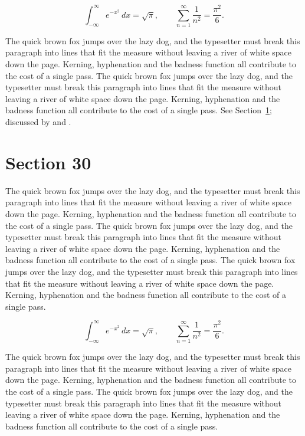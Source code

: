 \documentclass{article}
\begin{document}
\begin{equation}\label{eq:29}
\int_{-\infty}^{\infty} e^{-x^{2}}\,dx = \sqrt{\pi}, \qquad
\sum_{n=1}^{\infty} \frac{1}{n^{2}} = \frac{\pi^{2}}{6}.
\end{equation}

The quick brown fox jumps over the lazy dog, and the typesetter must break this paragraph into lines that fit the measure without leaving a river of white space down the page. Kerning, hyphenation and the badness function all contribute to the cost of a single pass. The quick brown fox jumps over the lazy dog, and the typesetter must break this paragraph into lines that fit the measure without leaving a river of white space down the page. Kerning, hyphenation and the badness function all contribute to the cost of a single pass. 
See Section~\ref{sec:30}; discussed by \textcite{k5} and \textcite{l2}.
\section{Section 30}
\label{sec:30}
The quick brown fox jumps over the lazy dog, and the typesetter must break this paragraph into lines that fit the measure without leaving a river of white space down the page. Kerning, hyphenation and the badness function all contribute to the cost of a single pass. The quick brown fox jumps over the lazy dog, and the typesetter must break this paragraph into lines that fit the measure without leaving a river of white space down the page. Kerning, hyphenation and the badness function all contribute to the cost of a single pass. The quick brown fox jumps over the lazy dog, and the typesetter must break this paragraph into lines that fit the measure without leaving a river of white space down the page. Kerning, hyphenation and the badness function all contribute to the cost of a single pass. 

\begin{equation}\label{eq:30}
\int_{-\infty}^{\infty} e^{-x^{2}}\,dx = \sqrt{\pi}, \qquad
\sum_{n=1}^{\infty} \frac{1}{n^{2}} = \frac{\pi^{2}}{6}.
\end{equation}

The quick brown fox jumps over the lazy dog, and the typesetter must break this paragraph into lines that fit the measure without leaving a river of white space down the page. Kerning, hyphenation and the badness function all contribute to the cost of a single pass. The quick brown fox jumps over the lazy dog, and the typesetter must break this paragraph into lines that fit the measure without leaving a river of white space down the page. Kerning, hyphenation and the badness function all contribute to the cost of a single pass. 
\end{document}
